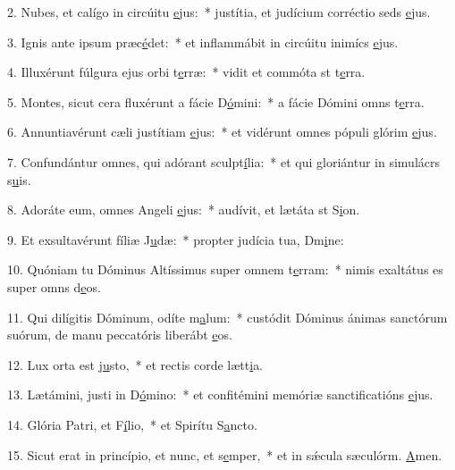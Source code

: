 2. Nubes, et calígo in circúitu \uline{e}jus:~* justítia, et judícium corréctio seds \uline{e}jus.\par 
3. Ignis ante ipsum præc\uline{é}det:~* et inflammábit in circúitu inimícs \uline{e}jus.\par 
4. Illuxérunt fúlgura ejus orbi t\uline{e}rræ:~* vidit et commóta st t\uline{e}rra.\par 
5. Montes, sicut cera fluxérunt a fácie D\uline{ó}mini:~* a fácie Dómini omns t\uline{e}rra.\par 
6. Annuntiavérunt cæli justítiam \uline{e}jus:~* et vidérunt omnes pópuli glórim \uline{e}jus.\par 
7. Confundántur omnes, qui adórant sculpt\uline{í}lia:~* et qui gloriántur in simulácrs s\uline{u}is.\par 
8. Adoráte eum, omnes Angeli \uline{e}jus:~* audívit, et lætáta st S\uline{i}on.\par 
9. Et exsultavérunt fíliæ J\uline{u}dæ:~* propter judícia tua, Dm\uline{i}ne:\par 
10. Quóniam tu Dóminus Altíssimus super omnem t\uline{e}rram:~* nimis exaltátus es super omns d\uline{e}os.\par 
11. Qui dilígitis Dóminum, odíte m\uline{a}lum:~* custódit Dóminus ánimas sanctórum suórum, de manu peccatóris liberábt \uline{e}os.\par 
12. Lux orta est j\uline{u}sto,~* et rectis corde lætt\uline{i}a.\par 
13. Lætámini, justi in D\uline{ó}mino:~* et confitémini memóriæ sanctificatións \uline{e}jus.\par 
14. Glória Patri, et F\uline{í}lio,~* et Spirítu S\uline{a}ncto.\par 
15. Sicut erat in princípio, et nunc, et s\uline{e}mper,~* et in sǽcula sæculórm. \uline{A}men.\par 
